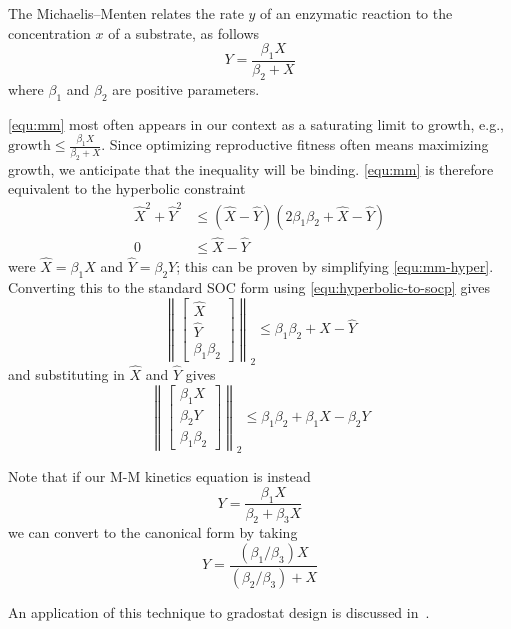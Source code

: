 \documentclass{article}
\begin{document}
The Michaelis--Menten relates the rate $y$ of an enzymatic reaction to the concentration $x$ of a substrate, as follows
\begin{equation}
\label{equ:mm}
Y = \frac{\beta_1 X}{\beta_2 + X}
\end{equation}
where $\beta_1$ and $\beta_2$ are positive parameters.

\autoref{equ:mm} most often appears in our context as a saturating limit to growth, e.g., $\textrm{growth}\le\frac{\beta_1 X}{\beta_2 + X}$. Since optimizing reproductive fitness often means maximizing growth, we anticipate that the inequality will be binding. \autoref{equ:mm} is therefore equivalent to the hyperbolic constraint
\begin{align}
\label{equ:mm-hyper}
\hat{X}^2+\hat{Y}^2 &\le (\hat{X}-\hat{Y})(2\beta_1\beta_2+\hat{X}-\hat{Y}) \\
   0    &\le \hat{X}-\hat{Y}
\end{align}
were $\hat{X}=\beta_1 X$ and $\hat{Y}=\beta_2Y$; this can be proven by simplifying \autoref{equ:mm-hyper}. Converting this to the standard SOC form using \autoref{equ:hyperbolic-to-socp} gives
\begin{equation}
\left\lVert \begin{bmatrix} \hat{X} \\ \hat{Y} \\ \beta_1\beta_2 \end{bmatrix} \right\rVert_2 \le \beta_1\beta_2 + \hat{X} - \hat{Y}
\end{equation}
and substituting in $\hat{X}$ and $\hat{Y}$ gives
\begin{equation}
\left\lVert \begin{bmatrix} \beta_1 X \\ \beta_2 Y \\ \beta_1\beta_2 \end{bmatrix} \right\rVert_2 \le \beta_1\beta_2 + \beta_1 X - \beta_2 Y
\end{equation}

Note that if our M-M kinetics equation is instead
\begin{equation}
  Y = \frac{\beta_1 X}{\beta_2 + \beta_3 X}
\end{equation}
we can convert to the canonical form by taking
\begin{equation}
  Y = \frac{(\beta_1/\beta_3) X}{(\beta_2/\beta_3) + X}
\end{equation}

An application of this technique to gradostat design is discussed in~\citep{Taylor2021}.
\end{document}
